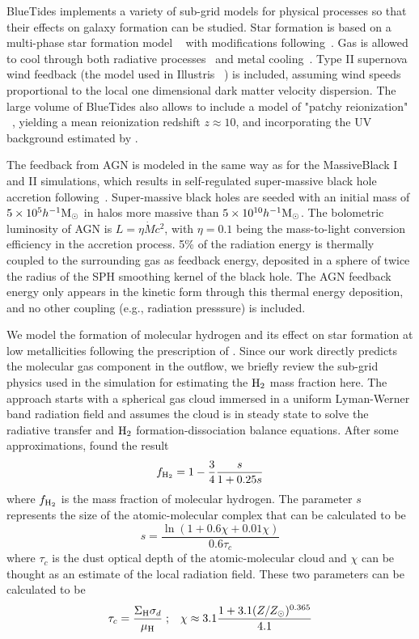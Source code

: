 \documentclass[a4paper,usenatbib]{mnras}
\begin{document}
BlueTides implements a variety of sub-grid models for physical processes so that their effects on galaxy formation can be studied. 
Star formation is based on a multi-phase star formation model ~\citep{Springel01} with modifications following~\cite{2013MNRAS.436.3031V}.
Gas is allowed to cool through both radiative processes~\citep{Katz} and metal cooling~\citep{Vogelsberger}. 
Type II supernova wind feedback (the model used in Illustris ~\citep{Nelson}) is included, assuming wind speeds proportional to the local one dimensional dark matter velocity dispersion. 
The large volume of BlueTides also allows to include a model of "patchy reionization" ~\citep{Battaglia}, yielding a mean reionization redshift $z\approx10$, and incorporating the UV background estimated by \cite{Faucher}. 

The feedback from AGN is modeled in the same way as for the MassiveBlack I and II simulations, which results in self-regulated super-massive black hole accretion following~\citep{DiMatteo}. 
Super-massive black holes are seeded with an initial mass of $5 \times 10^5 h^{-1}\rm{M}_{\odot}$ in halos more massive than $5 \times 10^{10} h^{-1}\rm{M}_{\odot}$. 
The bolometric luminosity of AGN is $L = \eta \dot{M}c^2$, with $\eta = 0.1$ being the mass-to-light conversion efficiency in the accretion process.
5\% of the radiation energy is thermally coupled to the surrounding gas as feedback energy, deposited in a sphere of twice the radius of the SPH smoothing kernel of the black hole. 
The AGN feedback energy only appears in the kinetic form through this thermal energy deposition, and no other coupling (e.g.,  radiation presssure) is included.

We model the formation of molecular hydrogen and its effect on star formation at low metallicities following the prescription of \cite{Krumholtz}. 
Since our work directly predicts the molecular gas component in the outflow, we briefly review the sub-grid physics used in the simulation for estimating  the $\rm{H}_2$ mass fraction here.   
The approach starts with a spherical gas cloud immersed in a uniform Lyman-Werner band radiation field and assumes the cloud is in steady state to solve the radiative transfer and $\rm{H}_2$ formation-dissociation balance equations. 
After some approximations, \cite{McKee} found the result
\begin{equation}
f_{\rm{H}_2} = 1 - \frac{3}{4}\frac{s}{1+0.25s}
\end{equation}
where $f_{\rm{H}_2}$ is the mass fraction of molecular hydrogen. The parameter $s$ represents the size of the atomic-molecular complex that can be calculated to be
\begin{equation}
s=\frac{\ln(1+0.6\chi+0.01\chi)}{0.6 \tau_{c}}
\end{equation}
where $\tau_{c}$ is the dust optical depth of the atomic-molecular cloud and $\chi$ can be thought as an estimate of the local radiation field. 
These two parameters can be calculated to be
\begin{equation}
\tau_{c}= \frac{\Sigma_{\rm{H}}\sigma_{d}}{\mu_{\rm{H}}} \;;\;\;\; 
\chi \approx 3.1\frac{1+3.1 (Z/Z_{\odot})^{0.365}}{4.1}
\end{equation}
\end{document}
